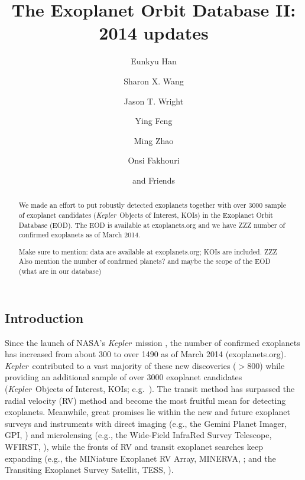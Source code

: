 \documentclass[11pt,preprint]{aastex}
\def\kepler{\textit{Kepler}}
\begin{document}
\begin{CJK*}{UTF8}{gbsn}

\title{The Exoplanet Orbit Database \textsc{II}: 2014 updates}

\author{Eunkyu Han}
\author{Sharon X. Wang}
\author{Jason T. Wright}
\author{Ying Feng}
\author{Ming Zhao}
\author{Onsi Fakhouri}
\author{and Friends}



\begin{abstract}
We made an effort to put robustly detected exoplanets together with over 3000 sample of exoplanet candidates (\kepler\ Objects of Interest, KOIs) in the Exoplanet Orbit Database (EOD). The EOD is available at exoplanets.org and we have ZZZ number of confirmed exoplanets as of March 2014. 

 Make sure to mention: data are available at exoplanets.org; KOIs are included.
ZZZ Also mention the number of confirmed planets? and maybe the scope of the EOD (what are in our database)
\end{abstract}  

\section{Introduction}\label{sec:intro}

Since the launch of NASA's \kepler\ mission \citep{Borucki2010}, the
number of confirmed exoplanets has increased from about 300 to over
1490 as of March 2014 (exoplanets.org). \kepler\ contributed to a vast
majority of these new discoveries ($> 800$) while providing an
additional sample of over 3000 exoplanet candidates (\kepler\ Objects
of Interest, KOIs; e.g.~\citealt{Batalha2013}). The transit method has
surpassed the radial velocity (RV) method and become the most fruitful
mean for detecting exoplanets. Meanwhile, great promises lie within
the new and future exoplanet surveys and instruments with direct
imaging (e.g., the Gemini Planet Imager, GPI,
\citealt{Macintosh2014}) and microlensing (e.g., the Wide-Field
InfraRed Survey Telescope, WFIRST, \citealt{Green2012}), while the
fronts of RV and transit exoplanet searches keep expanding (e.g., the
MINiature Exoplanet RV Array, MINERVA, \citealt{Wright2014}; and the
Transiting Exoplanet Survey Satellit, TESS, \citealt{Ricker2010}).


\end{CJK*}
\end{document}
